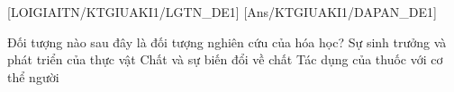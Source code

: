[LOIGIAITN/KTGIUAKI1/LGTN_DE1]
[Ans/KTGIUAKI1/DAPAN_DE1]
\begin{ex}
	Đối tượng nào sau đây là đối tượng nghiên cứu của hóa học?
	{Sự sinh trưởng và phát triển của thực vật}
	{Chất và sự biến đổi về chất}
	{Tác dụng của thuốc với cơ thể người}
	\loigiai{}
\end{ex}
